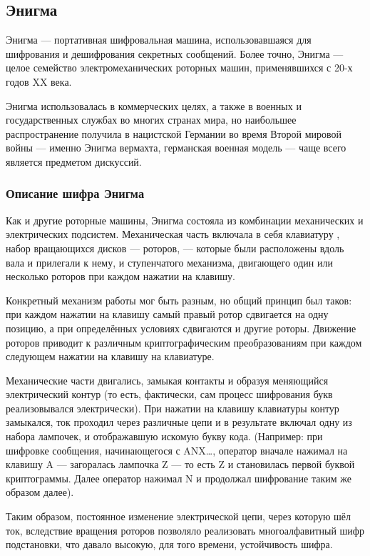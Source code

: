 \subsection{Энигма}

Энигма — портативная шифровальная машина, использовавшаяся для шифрования 
и дешифрования секретных сообщений. Более точно, Энигма — целое семейство 
электромеханических роторных машин, применявшихся с 20-х годов XX 
века.

Энигма использовалась в коммерческих целях, 
а также в военных и государственных 
службах во многих странах мира, но наибольшее распространение получила 
в нацистской Германии во время Второй мировой войны — именно Энигма 
вермахта, германская военная модель — чаще всего 
является предметом дискуссий.

\subsubsection{Описание шифра Энигма}

Как и другие роторные машины, Энигма состояла из комбинации механических 
и электрических подсистем. Механическая часть включала в себя клавиатуру
, набор вращающихся дисков — роторов, — которые были расположены вдоль 
вала и прилегали к нему, и ступенчатого механизма, двигающего один 
или несколько роторов при каждом нажатии на клавишу.

Конкретный механизм работы мог быть разным, но общий принцип был таков: 
при каждом нажатии на клавишу самый правый ротор сдвигается на одну 
позицию, а при определённых условиях сдвигаются и другие роторы. Движение 
роторов приводит к различным криптографическим преобразованиям при 
каждом следующем нажатии на клавишу на клавиатуре.

Механические части двигались, замыкая контакты и образуя меняющийся 
электрический контур (то есть, фактически, сам процесс шифрования 
букв реализовывался электрически). При нажатии на клавишу клавиатуры 
контур замыкался, ток проходил через различные цепи и в результате 
включал одну из набора лампочек, и отображавшую искомую букву кода.
(Например: при шифровке сообщения, начинающегося с ANX…, оператор 
вначале нажимал на клавишу A — загоралась лампочка Z — то есть Z и 
становилась первой буквой криптограммы. Далее оператор нажимал N и 
продолжал шифрование таким же образом далее).

Таким образом, постоянное изменение электрической цепи, через которую 
шёл ток, вследствие вращения роторов позволяло реализовать многоалфавитный 
шифр подстановки, что давало высокую, для того времени, устойчивость шифра.

